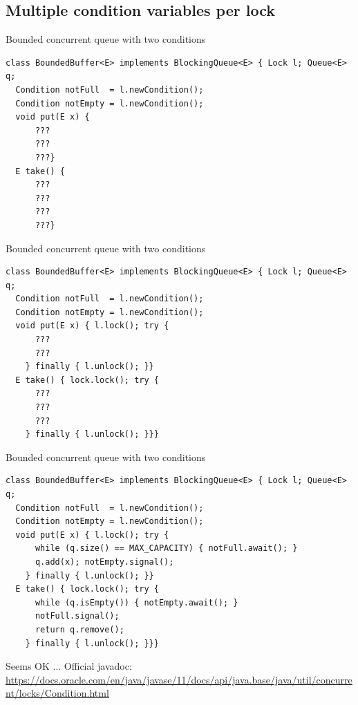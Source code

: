 \subsection{Multiple condition variables per lock}
\showTOCSub

\begin{frame}[t,fragile]{Bounded concurrent queue with two conditions}

\begin{verbatim}
class BoundedBuffer<E> implements BlockingQueue<E> { Lock l; Queue<E> q;
  Condition notFull  = l.newCondition(); 
  Condition notEmpty = l.newCondition(); 
  void put(E x) { 
      ???
      ???
      ???}
  E take() {
      ???
      ???
      ???
      ???}
\end{verbatim}
\end{frame}

\begin{frame}{Bounded concurrent queue with two conditions}

\begin{verbatim}
class BoundedBuffer<E> implements BlockingQueue<E> { Lock l; Queue<E> q;
  Condition notFull  = l.newCondition(); 
  Condition notEmpty = l.newCondition(); 
  void put(E x) { l.lock(); try {
      ???
      ???
    } finally { l.unlock(); }}
  E take() { lock.lock(); try {
      ???
      ???
      ???
    } finally { l.unlock(); }}}
\end{verbatim}
\end{frame}


\begin{frame}{Bounded concurrent queue with two conditions}

\begin{verbatim}
class BoundedBuffer<E> implements BlockingQueue<E> { Lock l; Queue<E> q;
  Condition notFull  = l.newCondition(); 
  Condition notEmpty = l.newCondition(); 
  void put(E x) { l.lock(); try {
      while (q.size() == MAX_CAPACITY) { notFull.await(); }
      q.add(x); notEmpty.signal();
    } finally { l.unlock(); }}
  E take() { lock.lock(); try {
      while (q.isEmpty()) { notEmpty.await(); }
      notFull.signal();
      return q.remove();
    } finally { l.unlock(); }}}
\end{verbatim}

\pause Seems OK ... \pause Official javadoc: {\tiny\url{https://docs.oracle.com/en/java/javase/11/docs/api/java.base/java/util/concurrent/locks/Condition.html}}

\end{frame}

